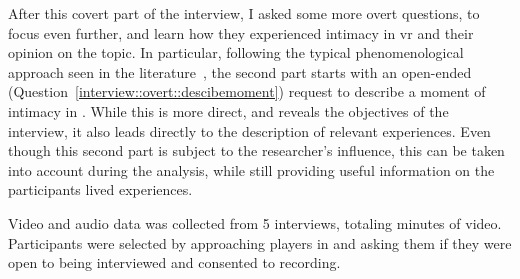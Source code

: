 After this covert part of the interview, I asked some more overt questions, to focus even further, and learn how they experienced intimacy in \gls{vr} and their opinion on the topic.
In particular, following the typical phenomenological approach seen in the literature~\cite{register92}, the second part starts with an open-ended (Question~\ref{interview::overt::descibemoment}) request to describe a moment of intimacy in \vrc. 
While this is more direct, and reveals the objectives of the interview, it also leads directly to the description of relevant experiences.
Even though this second part is subject to the researcher's influence, this can be taken into account during the analysis, while still providing useful information on the participants lived experiences.

Video and audio data was collected from 5 interviews, totaling  minutes of video. 
Participants were selected by approaching players in \vrc and asking them if they were open to being interviewed and consented to recording.